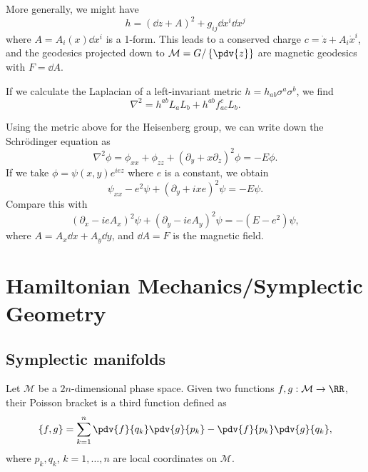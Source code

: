 \documentclass{jknotes}
\begin{document}
More generally, we might have
\begin{equation}
    h = (\dd{z} + A)^2 + g_{ij}\dd{x^i}\dd{x^j}
\end{equation}
where \(A=A_i(x)\dd{x^i}\) is a 1-form. This leads to a conserved charge \(c=\dot{z}+A_i\dot{x}^i\), and the geodesics projected down to \(\mathcal{M}=G/\left\{\pdv{z}\right\}\) are magnetic geodesics with \(F=\dd{A}\).

If we calculate the Laplacian of a left-invariant metric \(h=h_{ab}\sigma^a\sigma^b\), we find
\begin{equation}
    \nabla^2 = h^{ab}L_aL_b + h^{ab}f^c_{ac}L_b.
\end{equation}

\begin{eg}
    Using the metric above for the Heisenberg group, we can write down the Schr\"odinger equation as
    \begin{equation}
        \nabla^2\phi = \phi_{xx} + \phi_{zz} + (\partial_y + x\partial_z)^2\phi=-E\phi.
    \end{equation}
    If we take \(\phi=\psi(x,y)e^{iez}\) where \(e\) is a constant, we obtain
    \begin{equation}
        \psi_{xx}-e^2\psi + (\partial_y + ixe)^2\psi=-E\psi.
    \end{equation}
    Compare this with
    \begin{equation}
        (\partial_x-ieA_x)^2\psi + (\partial_y-ieA_y)^2\psi = -(E-e^2)\psi,
    \end{equation}
    where \(A=A_x\dd{x} + A_y\dd{y}\), and \(\dd{A}=F\) is the magnetic field.
\end{eg}

\section{Hamiltonian Mechanics/Symplectic Geometry}
\subsection{Symplectic manifolds}
Let \(\mathcal{M}\) be a \(2n\)-dimensional phase space. Given two functions \(f,g:\mathcal{M}\to\RR\), their Poisson bracket is a third function defined as
\begin{equation}
    \{f,g\} = \sum_{k=1}^n \pdv{f}{q_k}\pdv{g}{p_k} - \pdv{f}{p_k}\pdv{g}{q_k},
\end{equation}
where \(p_k,q_k\), \(k=1,\dots,n\) are local coordinates on \(\mathcal{M}\).
\end{document}
